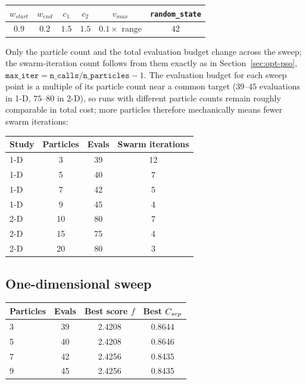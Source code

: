 \begin{center}
\begin{tabular}{@{}cccccc@{}}
\toprule
$w_{start}$ & $w_{end}$ & $c_1$ & $c_2$ & $v_{max}$ & \texttt{random\_state} \\
\midrule
$0.9$ & $0.2$ & $1.5$ & $1.5$ & $0.1 \times$ range & $42$ \\
\bottomrule
\end{tabular}
\end{center}

Only the particle count and the total evaluation budget change across the
sweep; the swarm-iteration count follows from them exactly as in
Section~\ref{sec:opt-pso},
$\texttt{max\_iter} = \texttt{n\_calls}/\texttt{n\_particles} - 1$.
The evaluation budget for each sweep point is a
multiple of its particle count near a common target ($39$--$45$
evaluations in 1-D, $75$--$80$ in 2-D), so runs with different
particle counts remain roughly comparable in total cost; more particles
therefore mechanically means fewer swarm iterations:

\begin{center}
\begin{tabular}{@{}lccc@{}}
\toprule
Study & Particles & Evals & Swarm iterations \\
\midrule
1-D & 3  & 39 & 12 \\
1-D & 5  & 40 & 7  \\
1-D & 7  & 42 & 5  \\
1-D & 9  & 45 & 4  \\
2-D & 10 & 80 & 7  \\
2-D & 15 & 75 & 4  \\
2-D & 20 & 80 & 3  \\
\bottomrule
\end{tabular}
\end{center}

\subsection{One-dimensional sweep}

\begin{center}
\begin{tabular}{@{}lccc@{}}
\toprule
Particles & Evals & Best score $f$ & Best $C_{sep}$ \\
\midrule
3 & 39 & 2.4208 & 0.8644 \\
5 & 40 & 2.4208 & 0.8646 \\
7 & 42 & 2.4256 & 0.8435 \\
9 & 45 & 2.4256 & 0.8435 \\
\bottomrule
\end{tabular}
\end{center}

